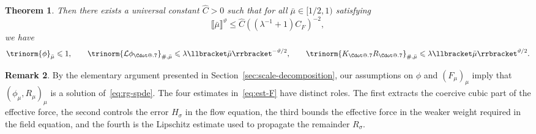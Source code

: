 \documentclass{article}
\makeatletter
\numberwithin{equation}{section}
\newcommand*\Cdot{{\mathpalette\Cdot@{.7}}}
\newcommand*\Cdot@[2]{\mathbin{\vcenter{\hbox{\scalebox{#2}{\hspace{0.1mm}$\m@th#1\bullet$\hspace{0.1mm}}}}}}
\theoremstyle{plain}
\newtheorem{theorem}{Theorem}[section]
\theoremstyle{definition}
\newtheorem{remark}[theorem]{Remark}
\makeatother
\begin{document}
\begin{theorem}
  Then there exists a universal constant $\hat{C} > 0$ such that for all
  $\bar{\mu} \in [1 / 2, 1)$ satisfying
  \begin{equation}
    \llbracket \bar{\mu} \rrbracket^{\vartheta} \leqslant
    \hat{C}  ((\lambda^{- 1} + 1) C_F)^{- 2}, \label{eq:bound-mubar}
  \end{equation}
  we have
  \[ \trinorm{ \phi }_{\bar{\mu}} \leqslant 1, \qquad \trinorm{
     \mathcal{L} \phi_{\Cdot} }_{\#, \bar{\mu}} \leqslant \lambda
     \llbracket \bar{\mu} \rrbracket^{- \vartheta / 2}, \qquad \trinorm{
     K_{\Cdot} R_{\Cdot} }_{\#, \bar{\mu}} \leqslant \lambda
     \llbracket \bar{\mu} \rrbracket^{\vartheta / 2} . \]
\end{theorem}

\begin{remark}
  By the elementary argument presented in Section~\ref{sec:scale-decomposition},
  our assumptions on $\phi$ and $(F_{\mu})_{\mu}$ imply that $(\phi_{\mu},
  R_{\mu})_{\mu}$ is a solution of~\eqref{eq:rg-spde}.
  The four estimates in~\eqref{eq:est-F} have distinct roles. The first extracts
  the coercive cubic part of the effective force, the second controls the error
  $H_{\sigma}$ in the flow equation, the third bounds the effective
  force in the weaker weight required in the field equation, and the fourth is
  the Lipschitz estimate used to propagate the remainder $R_{\sigma}$.
\end{remark}
\end{document}
